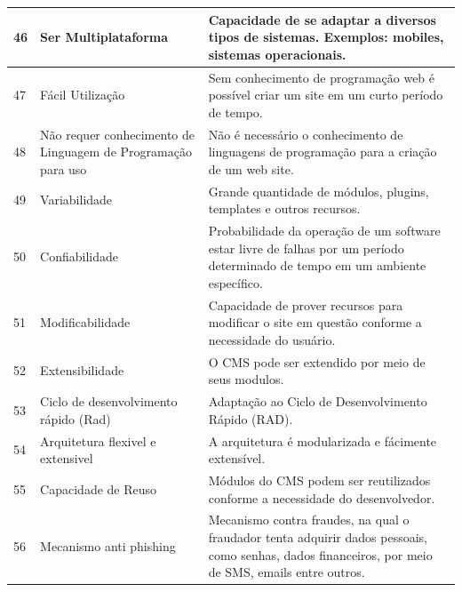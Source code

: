 \begin{apendicesenv}
\begin{landscape}
\begin{longtable}{|p{10pt}|p{220pt}|p{415pt}|}
 	 {\raggedright {46}}
 	  	 	 	 	 & {\raggedright {Ser Multiplataforma}}
 	  	 	 	 	 & {\raggedright {Capacidade de se adaptar a diversos tipos de sistemas. Exemplos: mobiles, sistemas operacionais. \cite{Nurminen2008}}}\\
 	  	 	 	 	\hline
 	 {\raggedright {47}}
 	  	  	 	 	 	 & {\raggedright {Fácil Utilização}}
 	  	  	 	 	 	 & {\raggedright {Sem conhecimento de programação web é possível criar um site em um curto período de tempo. \cite{Patnaik2015}}}\\
 	  	  	 	 	 	\hline
 	 {\raggedright {48}}
 	  	 	 	 	 & {\raggedright {Não requer conhecimento de Linguagem de Programação para uso}}
 	  	 	 	 	 & {\raggedright {Não é necessário o conhecimento de linguagens de programação para a criação de um web site. \cite{Distante2010}}}\\
 	  	 	 	 	\hline
 	 {\raggedright {49}}
 	  	 	 	 	 & {\raggedright {Variabilidade}}
 	  	 	 	 	 & {\raggedright {Grande quantidade de módulos, plugins, templates e outros recursos. \cite{Galster2013}}}\\
 	  	 	 	 	\hline
 	  	 	 	 	{\raggedright {50}}
 	  	 	 	 	 & {\raggedright {Confiabilidade}}
 	  	 	 	 	 	 	 	 	 & {\raggedright {Probabilidade da
 	  	 	 	 	 	 	 	 	 operação de um software estar livre de falhas por um período determinado
 	  	 	 	 	 	 	 	 	 de tempo em um ambiente específico. \cite{Galster2013}}}\\
 	  	 	 	 	 	 	 	 	\hline 
 	 {\raggedright {51}}
 	  	 	 	 	 & {\raggedright {Modificabilidade}}
 	  	 	 	 	 & {\raggedright {Capacidade de prover recursos para modificar o site em questão conforme a necessidade do usuário. \cite{Cymbalak2012}}}\\
 	  	 	 	 	\hline
{\raggedright {52}}
 	 	 & {\raggedright {Extensibilidade}}
 	 	 & {\raggedright {O CMS pode ser extendido por meio de seus modulos. \cite{Ennert2012}}}\\
 	 	\hline
 	{\raggedright {53}}
 	 	 & {\raggedright {Ciclo de desenvolvimento rápido (Rad)}}
 	 	 & {\raggedright {Adaptação ao Ciclo de Desenvolvimento Rápido (RAD). \cite{Hanlon2010}}}\\
 	 	\hline
 	{\raggedright {54}}
 	 	 & {\raggedright {Arquitetura flexivel e extensivel}}
 	 	 & {\raggedright {A arquitetura é modularizada e fácimente extensível. \cite{Hanlon2010}}}\\
 	 	\hline
 	 	{\raggedright {55}}
 	 	 	 	 & {\raggedright {Capacidade de Reuso}}
 	 	 	 	 & {\raggedright {Módulos do CMS podem ser reutilizados conforme a necessidade do desenvolvedor. \cite{Priya2012}}}\\
 	 	 	 	\hline
 	 {\raggedright {56}}
 	  	 	 	 	 & {\raggedright {Mecanismo anti phishing}}
 	  	 	 	 	 & {\raggedright {Mecanismo contra fraudes, na qual o fraudador tenta adquirir dados pessoais, como senhas, dados financeiros, por meio de SMS, emails entre outros. \cite{Vasek2015}}}\\
 	  	 	 	 	\hline
 	  	 	 	 	

\end{longtable}
\end{landscape}
\end{apendicesenv}
